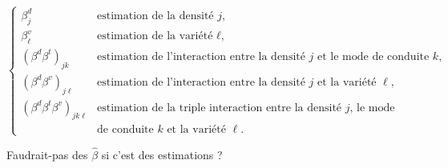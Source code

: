 \documentclass[a4paper, landscape, 11pt]{article}
\begin{document}
\vspace{2cm}

\[
\begin{cases}
 \beta_j^d & \text{estimation de la densité $j$,}\\
 \beta_\ell^v & \text{estimation de la variété $\ell$,}\\
 \left( \beta^d\beta^t \right)_{jk} & \text{estimation de l'interaction entre la densité $j$ et le mode de conduite $k$,}\\
 \left( \beta^d\beta^v \right)_{j\ell} & \text{estimation de l'interaction entre la densité $j$ et la variété $\ell$,}\\
 \left( \beta^d\beta^t\beta^v \right)_{jk\ell} & \text{estimation de la triple interaction entre la densité $j$, le mode}\\
 & \text{de conduite $k$ et la variété $\ell$.}
\end{cases}
\]

\vspace{2cm}

Faudrait-pas des $\hat \beta$ si c'est des estimations ?
\end{document}

